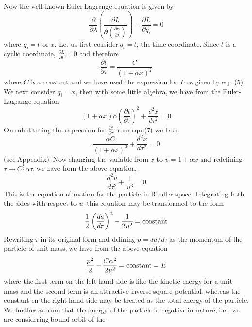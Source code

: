 \documentclass[12pt]{article}
\begin{document}
Now the well known Euler-Lagrange equation is given by
  \begin{equation} 
 \frac{\partial}{\partial \lambda}\left (\frac{\partial L}{\partial(\frac{\partial
 q_i}{\partial \lambda})}\right )-\frac{\partial L}{\partial q_i}=0
 \end{equation}
 where $q_i=t$ or $x$. Let us first consider $q_i=t$, the time coordinate. Since $t$ is
 a cyclic coordinate, $\frac{\partial L}{\partial t}=0$ and therefore
 \begin{equation}
 \frac{\partial t}{\partial \tau}=\frac{C}{(1+\alpha x)^2}
  \end{equation}
 where $C$ is a constant and we have used the expression for $L$  as given by eqn.(5).
We next consider $q_i=x$, then with some little algebra, we have from the Euler-Lagrange equation
\begin{equation} 
 (1+\alpha x)\alpha \left (\frac{\partial t}{\partial \tau}\right )^2+\frac{d^2x}{d\tau ^2}=0
   \end{equation}
 On substituting the expression for $\frac{\partial t}{\partial \tau}$ from eqn.(7) we have
 \begin{equation} 
 \frac{\alpha C}{(1+\alpha x)^3}+\frac{d^2 x}{d\tau ^2}=0
 \end{equation}
(see Appendix). Now changing the variable from $x$ to $u=1+\alpha x$ and redefining 
$\tau\rightarrow C^\frac{1}{2}\alpha \tau$, we have from the above equation,
 \begin{equation} 
 \frac{d^2 u}{d \tau^2}+\frac{1}{u^3}=0
 \end{equation} 
This is the equation of motion for the particle in Rindler space.
Integrating both the sides with respect to $u$, this equation may be transformed to the form
 \begin{equation} 
 \frac{1}{2}\left (\frac{du}{d\tau}\right )^2-\frac{1}{2u^2}={\rm{constant}}
 \end{equation}
Rewriting $\tau$ in its original form and defining $p=du/d\tau$ as the momentum of the particle of
unit mass, we have from the above equation
\begin{equation}
\frac{p^2}{2}-\frac{C\alpha^2}{2u^2}={\rm{constant}}=E
\end{equation}
where the first term on the left hand side is like the kinetic energy for a unit mass and
the second term is an attractive inverse square potential, whereas the constant on the right 
hand side may be treated as the total energy of the particle. We further assume that the
energy of the particle is negative in nature, i.e., we are considering bound orbit of the
\end{document}
